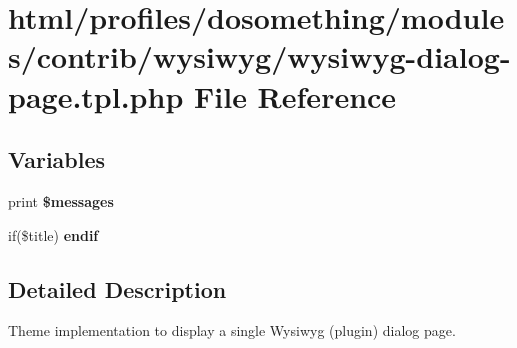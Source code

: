 \hypertarget{wysiwyg-dialog-page_8tpl_8php}{
\section{html/profiles/dosomething/modules/contrib/wysiwyg/wysiwyg-\/dialog-\/page.tpl.php File Reference}
\label{wysiwyg-dialog-page_8tpl_8php}
}
\subsection*{Variables}
\begin{DoxyCompactItemize}
\item 
\hypertarget{wysiwyg-dialog-page_8tpl_8php_a563294b2ecdb9ce8d9f8d20f680b5592}{
print {\bfseries \$messages}}
\label{wysiwyg-dialog-page_8tpl_8php_a563294b2ecdb9ce8d9f8d20f680b5592}

\item 
\hypertarget{wysiwyg-dialog-page_8tpl_8php_a82cd33ca97ff99f2fcc5e9c81d65251b}{
if(\$title) {\bfseries endif}}
\label{wysiwyg-dialog-page_8tpl_8php_a82cd33ca97ff99f2fcc5e9c81d65251b}

\end{DoxyCompactItemize}


\subsection{Detailed Description}
Theme implementation to display a single Wysiwyg (plugin) dialog page. 